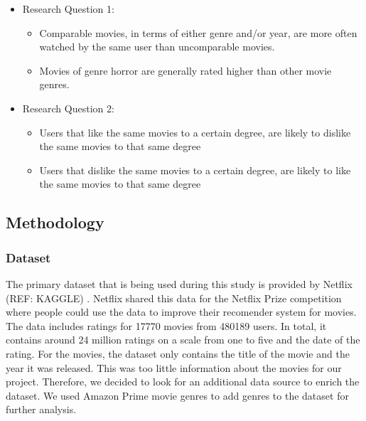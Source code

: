 \documentclass[
  man]{apa6}
\providecommand{\tightlist}{%
  \setlength{\itemsep}{0pt}\setlength{\parskip}{0pt}}
\begin{document}
\begin{itemize}
\tightlist
\item
  Research Question 1:

  \begin{itemize}
  \tightlist
  \item
    Comparable movies, in terms of either genre and/or year, are more
    often watched by the same user than uncomparable movies.\\
  \item
    Movies of genre horror are generally rated higher than other movie
    genres.
  \end{itemize}
\item
  Research Question 2:

  \begin{itemize}
  \tightlist
  \item
    Users that like the same movies to a certain degree, are likely to
    dislike the same movies to that same degree
  \item
    Users that dislike the same movies to a certain degree, are likely
    to like the same movies to that same degree
  \end{itemize}
\end{itemize}

\hypertarget{methodology}{%
\subsection{Methodology}\label{methodology}}

\hypertarget{dataset}{%
\subsubsection{Dataset}\label{dataset}}

The primary dataset that is being used during this study is provided by
Netflix (REF: KAGGLE) . Netflix shared this data for the Netflix Prize
competition where people could use the data to improve their recomender
system for movies. The data includes ratings for 17770 movies from
480189 users. In total, it contains around 24 million ratings on a scale
from one to five and the date of the rating. For the movies, the dataset
only contains the title of the movie and the year it was released. This
was too little information about the movies for our project. Therefore,
we decided to look for an additional data source to enrich the dataset.
We used Amazon Prime movie genres to add genres to the dataset for
further analysis.
\end{document}
